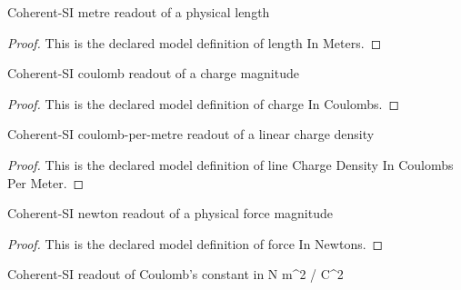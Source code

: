 \begin{definition}
  \label{def:physics:phyx-mini-0839:phyxminiproblems-problemphyxmini0839-lengthinmeters}
  Coherent-SI metre readout of a physical length
\end{definition}
\begin{proof}
  This is the declared model definition of length In Meters.
\end{proof}
\begin{definition}
  \label{def:physics:phyx-mini-0839:phyxminiproblems-problemphyxmini0839-chargeincoulombs}
  Coherent-SI coulomb readout of a charge magnitude
\end{definition}
\begin{proof}
  This is the declared model definition of charge In Coulombs.
\end{proof}
\begin{definition}
  \label{def:physics:phyx-mini-0839:phyxminiproblems-problemphyxmini0839-linechargedensityincoulombspermeter}
  Coherent-SI coulomb-per-metre readout of a linear charge density
\end{definition}
\begin{proof}
  This is the declared model definition of line Charge Density In Coulombs Per Meter.
\end{proof}
\begin{definition}
  \label{def:physics:phyx-mini-0839:phyxminiproblems-problemphyxmini0839-forceinnewtons}
  Coherent-SI newton readout of a physical force magnitude
\end{definition}
\begin{proof}
  This is the declared model definition of force In Newtons.
\end{proof}
\begin{definition}
  \label{def:physics:phyx-mini-0839:phyxminiproblems-problemphyxmini0839-coulombconstantinnewtonmeterssquaredpercoulombsquared}
  Coherent-SI readout of Coulomb's constant in N m\textasciicircum{}2 / C\textasciicircum{}2
\end{definition}
